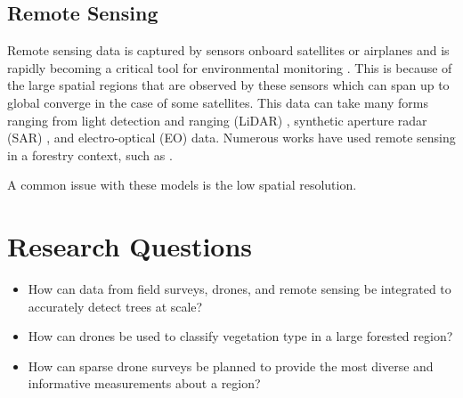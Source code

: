 \subsection{Remote Sensing}
Remote sensing data is captured by sensors onboard satellites or airplanes and is rapidly becoming a critical tool for environmental monitoring \cite{Parra2022RemoteMonitoring}. This is because of the large spatial regions that are observed by these sensors which can span up to global converge in the case of some satellites. This data can take many forms ranging from light detection and ranging (LiDAR) \cite{LiDARForestryBeland2019}, synthetic aperture radar (SAR) \cite{Hall2020WhatEarthdata}, and electro-optical (EO) data. Numerous works have used remote sensing in a forestry context, such as \cite{Kempeneers2011DataMapping, Hansen2013High-resolutionChange, Ewald2023Remote}.

A common issue with these models is the low spatial resolution.

\section{Research Questions}
\begin{itemize}
    \item How can data from field surveys, drones, and remote sensing be integrated to accurately detect trees at scale?
\end{itemize}
\begin{itemize}
    \item How can drones be used to classify vegetation type in a large forested region?
\end{itemize}
\begin{itemize}
    \item How can sparse drone surveys be planned to provide the most diverse and informative measurements about a region?
\end{itemize}



